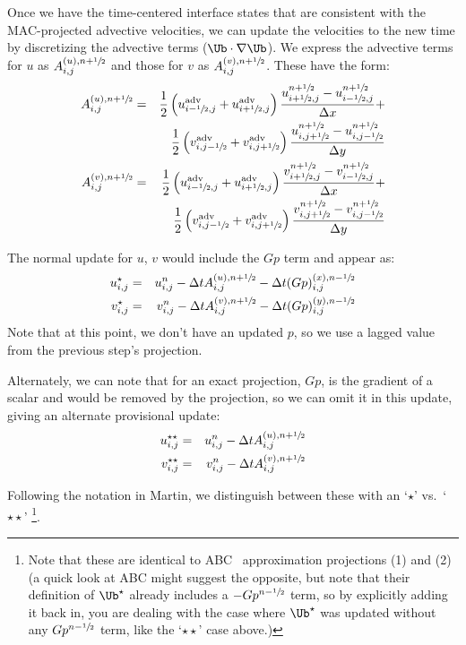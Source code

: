 Once we have the time-centered interface states that are consistent with
the MAC-projected advective velocities, we can update the velocities to
the new time by discretizing the advective terms ($\Ub\cdot \nabla \Ub$).
We express the advective terms for $u$ as $A^{(u),n+{\sfrac{1}{2}}}_{i,j}$ and
those for $v$ as $A^{(v),n+{\sfrac{1}{2}}}_{i,j}$.  These have the form:
\begin{eqnarray}
A^{(u),n+\myhalf}_{i,j} =
   && \frac{1}{2}
     \left ( u^\mathrm{adv}_{i-\myhalf,j} + u^\mathrm{adv}_{i+\myhalf,j} \right )
     \frac{u^{n+\myhalf}_{i+\myhalf,j} - u^{n+\myhalf}_{i-\myhalf,j}}{\Delta x} + \nonumber \\
   && \frac{1}{2}
     \left ( v^\mathrm{adv}_{i,j-\myhalf} + v^\mathrm{adv}_{i,j+\myhalf} \right )
     \frac{u^{n+\myhalf}_{i,j+\myhalf} - u^{n+\myhalf}_{i,j-\myhalf}}{\Delta y} \\
%
A^{(v),n+\myhalf}_{i,j} =
   && \frac{1}{2}
     \left ( u^\mathrm{adv}_{i-\myhalf,j} + u^\mathrm{adv}_{i+\myhalf,j} \right )
     \frac{v^{n+\myhalf}_{i+\myhalf,j} - v^{n+\myhalf}_{i-\myhalf,j}}{\Delta x} \nonumber +\\
   && \frac{1}{2}
     \left ( v^\mathrm{adv}_{i,j-\myhalf} + v^\mathrm{adv}_{i,j+\myhalf} \right )
     \frac{v^{n+\myhalf}_{i,j+\myhalf} - v^{n+\myhalf}_{i,j-\myhalf}}{\Delta y}
\end{eqnarray}

The normal update for $u$, $v$ would include the $Gp$ term and appear
as:
\begin{eqnarray}
u^{\star}_{i,j} &=& u^n_{i,j} - \Delta t A^{(u),n+{\sfrac{1}{2}}}_{i,j} - \Delta t (G p)^{(x),n-{\sfrac{1}{2}}}_{i,j} \\
v^{\star}_{i,j} &=& v^n_{i,j} - \Delta t A^{(v),n+{\sfrac{1}{2}}}_{i,j} - \Delta t (G p)^{(y),n-{\sfrac{1}{2}}}_{i,j}
\end{eqnarray}
Note that at this point, we don't have an updated $p$, so we use a lagged
value from the previous step's projection.

Alternately, we can note that for an exact projection, $Gp$, is the gradient
of a scalar and would be removed by the projection, so we can omit it in
this update, giving an alternate provisional update:
\begin{eqnarray}
u^{\star\star}_{i,j} &=& u^n_{i,j} - \Delta t A^{(u),n+{\sfrac{1}{2}}}_{i,j}  \\
v^{\star\star}_{i,j} &=& v^n_{i,j} - \Delta t A^{(v),n+{\sfrac{1}{2}}}_{i,j}
\end{eqnarray}


Following the notation in Martin, we distinguish between these with
an `$\star$' vs.\ `$\star\star$' \footnote{Note that these are identical to
ABC~\cite{ABC} approximation projections (1) and (2) (a quick look at ABC might
suggest the opposite, but note that their definition of $\Ub^\star$
already includes a $-Gp^{n-{\sfrac{1}{2}}}$ term, so by explicitly adding it back
in, you are dealing with the case where $\Ub^\star$ was updated without
any $Gp^{n-{\sfrac{1}{2}}}$ term, like the `$\star\star$' case above.)}.


